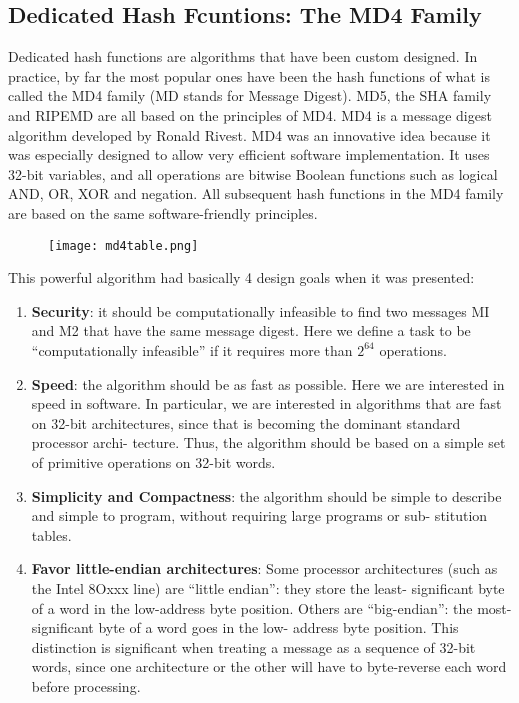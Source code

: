\documentclass{article}
\begin{document}
\subsection{Dedicated Hash Fcuntions: The MD4 Family}
Dedicated hash functions are algorithms that have been custom designed.  In practice, by far the most popular ones have been the hash functions of what is called the MD4 family (MD stands for Message Digest). MD5, the SHA family and RIPEMD are all based on the principles of MD4. MD4 is a message digest algorithm developed by Ronald Rivest. MD4 was
an innovative idea because it was especially designed to allow very efficient software implementation. It uses 32-bit variables, and all operations are bitwise Boolean
functions such as logical AND, OR, XOR and negation. All subsequent hash functions in the MD4 family are based on the same software-friendly principles.
\begin{figure} [H]
    \centering
    \texttt{[image: md4table.png]}
\end{figure}
This powerful algorithm had basically 4 design goals when it was presented:
\begin{enumerate}
    \item \textbf{Security}: it should be computationally infeasible to find  two messages MI and M2 that have the same message digest. Here we define a task to be “computationally infeasible” if it requires more than $2^64$ operations. 
    \item \textbf{Speed}: the algorithm should be as fast as possible. Here we are interested  in speed in software. In particular, we are interested in algorithms that are fast on 32-bit architectures, since that is becoming the dominant standard processor archi- tecture.  Thus, the algorithm should  be based on a simple set of primitive operations on 32-bit  words.
    \item \textbf{Simplicity and Compactness}: the algorithm should be simple to describe and simple to program,  without  requiring large programs or sub- stitution tables.
    \item \textbf{Favor little-endian architectures}: Some processor architectures (such as the Intel 8Oxxx line) are  “little endian”: they store the least- significant byte of a  word  in the low-address byte position. Others are “big-endian”: the most-significant byte of a word goes in the low- address byte position. This distinction is significant  when treating a message as a sequence of 32-bit  words,  since one architecture or the other will have to byte-reverse each word before  processing.
\end{enumerate}
\end{document}
